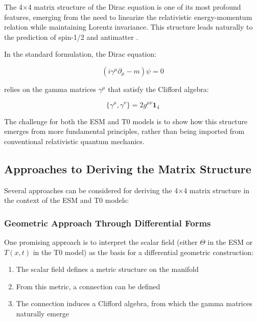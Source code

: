 \documentclass[12pt,a4paper]{article}
\newcommand{\Tfieldt}{T(x,t)}
\begin{document}
	The 4$\times$4 matrix structure of the Dirac equation is one of its most profound features, emerging from the need to linearize the relativistic energy-momentum relation while maintaining Lorentz invariance. This structure leads naturally to the prediction of spin-1/2 and antimatter \cite{dirac1928}.
	
	In the standard formulation, the Dirac equation:
	
	\begin{equation}
		(i\gamma^{\mu}\partial_{\mu} - m)\psi = 0
		\label{eq:standard_dirac}
	\end{equation}
	
	relies on the gamma matrices $\gamma^{\mu}$ that satisfy the Clifford algebra:
	
	\begin{equation}
		\{\gamma^{\mu}, \gamma^{\nu}\} = 2g^{\mu\nu}\mathbf{1}_4
		\label{eq:clifford_algebra}
	\end{equation}
	
	The challenge for both the ESM and T0 models is to show how this structure emerges from more fundamental principles, rather than being imported from conventional relativistic quantum mechanics.
	
	\subsection{Approaches to Deriving the Matrix Structure}
	\label{subsec:derivation_approaches}
	
	Several approaches can be considered for deriving the 4$\times$4 matrix structure in the context of the ESM and T0 models:
	
	\subsubsection{Geometric Approach Through Differential Forms}
	\label{subsubsec:geometric_approach}
	
	One promising approach is to interpret the scalar field (either $\Theta$ in the ESM or $\Tfieldt$ in the T0 model) as the basis for a differential geometric construction:
	
	\begin{enumerate}
		\item The scalar field defines a metric structure on the manifold
		\item From this metric, a connection can be defined
		\item The connection induces a Clifford algebra, from which the gamma matrices naturally emerge
	\end{enumerate}
	
\end{document}
